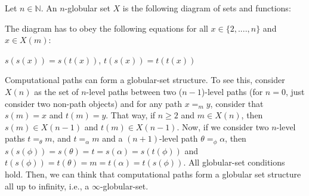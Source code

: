 \documentclass{entcs} \usepackage{entcsmacro}
\newcommand{\Nat}{{\mathbb N}}
\begin{document}
\begin{definition}
Let $n \in \Nat$. An $n$-globular set $X$ is the following diagram of sets and functions: 

\bigskip

\begin{center}
\end{center}

\bigskip

The diagram has to obey the following equations for all $x \in \{2, . . . ., n\}$ and $x\in X(m)$:

\begin{center}
$s(s(x)) = s(t(x))$, \quad $t(s(x)) = t(t(x))$
\end{center}

\end{definition}

Computational paths can form a globular-set structure. To see this, consider $X(n)$ as the set of $n$-level paths between two ($n-1$)-level paths (for $n = 0$, just consider two non-path objects) and for any path $x =_{m} y$, consider that $s(m) = x$ and $t(m) = y$. That way, if $n \geq 2$ and $m \in X(n)$, then $s(m) \in X(n - 1)$ and $t(m) \in X(n-1)$. Now, if we consider two $n$-level paths $t =_{\theta} m$, and $t = _{\alpha} m$ and a $(n+1)$-level path $\theta =_{\phi} \alpha$, then $s(s(\phi)) = s(\theta) = t = s(\alpha) = s(t(\phi))$ and $t(s(\phi)) = t(\theta) = m = t(\alpha) = t(s(\phi))$. All globular-set conditions hold. Then, we can think that computational paths form a globular set structure all up to infinity, i.e., a $\infty$-globular-set.
\end{document}
